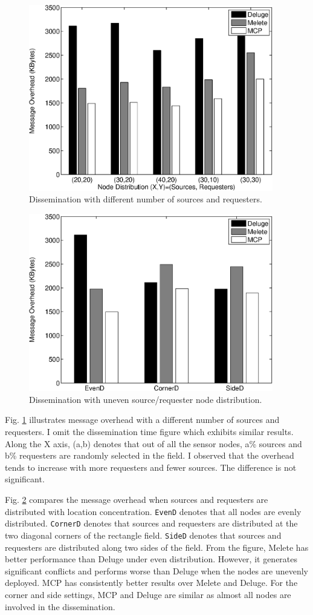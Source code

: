 \begin{figure}[htbp]
\centering
\includegraphics[width=4.2in]{figures/fdist1.eps}
\caption{Dissemination with different number of sources and requesters.}
\label{fsr}
\end{figure}

\begin{figure}[htbp]
\centering
\includegraphics[width=4.2in]{figures/fdist3.eps}
\caption{Dissemination with uneven source/requester node distribution.}
\label{floc}
\end{figure}

Fig. \ref{fsr} illustrates message overhead with a different number of sources and requesters. I omit the dissemination time figure which exhibits similar results.
Along the X axis, (a,b) denotes that out of all the sensor nodes, a\% sources and b\% requesters are randomly selected in the field. I observed that the overhead tends to increase with more requesters and fewer sources. The difference is not significant.


Fig. \ref{floc} compares the message overhead when sources and requesters are distributed with location concentration. {\tt EvenD} denotes that all nodes are evenly distributed. {\tt CornerD} denotes that sources and requesters are distributed at the two diagonal corners of the rectangle field. {\tt SideD} denotes that sources and requesters are distributed along two sides of the field. From the figure, Melete has better performance than Deluge under even distribution. However, it generates significant conflicts and performs worse than Deluge when the nodes are unevenly deployed. MCP has consistently better results over Melete and Deluge. For the corner and side settings, MCP and Deluge are similar as almost all nodes are involved in the dissemination. 


